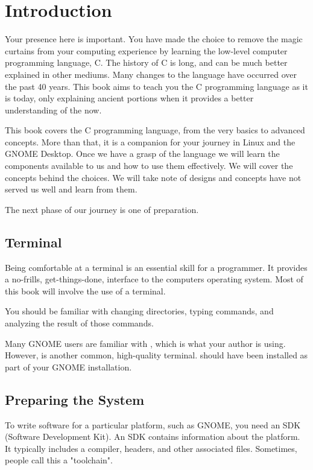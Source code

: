 \chapter{Introduction}

Your presence here is important. You have made the choice to remove the magic
curtains from your computing experience by learning the low-level computer
programming language, C. The history of C is long, and can be much better
explained in other mediums. Many changes to the language have occurred over
the past 40 years. This book aims to teach you the C programming language as
it is today, only explaining ancient portions when it provides a better
understanding of the now.

This book covers the C programming language, from the very basics to advanced
concepts. More than that, it is a companion for your journey in Linux and the
GNOME Desktop. Once we have a grasp of the language we will learn the
components available to us and how to use them effectively. We will cover the
concepts behind the choices. We will take note of designs and concepts have
not served us well and learn from them.

The next phase of our journey is one of preparation.


\section{Terminal}

Being comfortable at a terminal is an essential skill for a programmer. It
provides a no-frills, get-things-done, interface to the computers operating
system. Most of this book will involve the use of a terminal.

You should be familiar with changing directories, typing commands, and
analyzing the result of those commands.

Many GNOME users are familiar with , which is what your
author is using. However,  is another common, high-quality
terminal.  should have been installed as part of your
GNOME installation.


\section{Preparing the System}

To write software for a particular platform, such as GNOME, you need an SDK
(Software Development Kit). An SDK contains information about the platform. It
typically includes a compiler, headers, and other associated files. Sometimes,
people call this a "toolchain".

